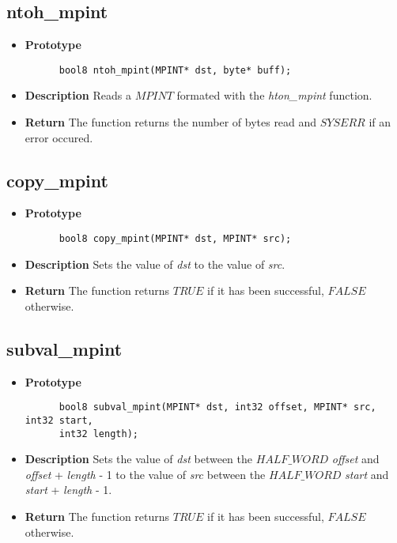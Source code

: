 \documentclass[10pt,a4paper]{article}
\begin{document}
  
  \subsection{ntoh\_mpint}
  
  \begin{itemize}
    \item [] \textbf{Prototype}
    \begin{lstlisting}
      bool8 ntoh_mpint(MPINT* dst, byte* buff);
    \end{lstlisting}
    \item [] \textbf{Description} Reads a $MPINT$ formated with the \textit{hton\_mpint} function.
    \item [] \textbf{Return} The function returns the number of bytes read and $SYSERR$ if an error occured.
  \end{itemize}
  
  \subsection{copy\_mpint}
  
  \begin{itemize}
    \item [] \textbf{Prototype}
    \begin{lstlisting}
      bool8 copy_mpint(MPINT* dst, MPINT* src);
    \end{lstlisting}
    \item [] \textbf{Description} Sets the value of \textit{dst} to the value of \textit{src}.
    \item [] \textbf{Return} The function returns $TRUE$ if it has been successful, $FALSE$ otherwise.
  \end{itemize}
  
  \subsection{subval\_mpint}
  
  \begin{itemize}
    \item [] \textbf{Prototype}
    \begin{lstlisting}
      bool8 subval_mpint(MPINT* dst, int32 offset, MPINT* src, int32 start,
      int32 length);
    \end{lstlisting}
    \item [] \textbf{Description} Sets the value of \textit{dst} between the $HALF\_WORD$ \textit{offset} and \textit{offset} + \textit{length} - 1 to the value of \textit{src} between the $HALF\_WORD$ \textit{start} and \textit{start} + \textit{length} - 1.
    \item [] \textbf{Return} The function returns $TRUE$ if it has been successful, $FALSE$ otherwise.
  \end{itemize}
  
\end{document}
